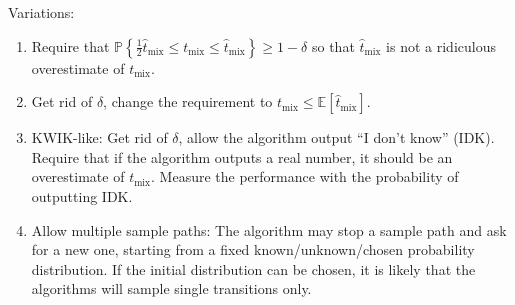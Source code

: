 \documentclass[11pt]{article}
\newcommand{\Prob}[1]{\mathbb{P}\left\{#1\right\}}
\newcommand{\EE}[1]{\mathbb{E}\left[#1\right]}
\theoremstyle{plain}
\theoremstyle{definition}
\theoremstyle{remark}
\newcommand\tmix{\ensuremath{t_{\mathrm{mix}}}}
\newcommand\htmix{\ensuremath{\hat{t}_{\mathrm{mix}}}}
\begin{document}
\noindent Variations:
\begin{enumerate}[{\emph (i)}]
\item Require that $\Prob{ \frac12 \htmix \le \tmix \le \htmix } \ge 1-\delta$ so that $\htmix$ is not a ridiculous overestimate of $\tmix$.
\item Get rid of $\delta$, change the requirement to $\tmix \le \EE{\htmix}$.
\item KWIK-like: Get rid of $\delta$, allow the algorithm output ``I don't know'' (IDK). Require that if the algorithm outputs a real number, it should be an overestimate of $\tmix$. Measure the performance with the probability of outputting IDK.
\item Allow multiple sample paths: The algorithm may stop a sample path and ask for a new one, starting from a fixed known/unknown/chosen probability distribution. If the initial distribution can be chosen, it is likely that the algorithms will sample single transitions only.
\end{enumerate}
\end{document}
